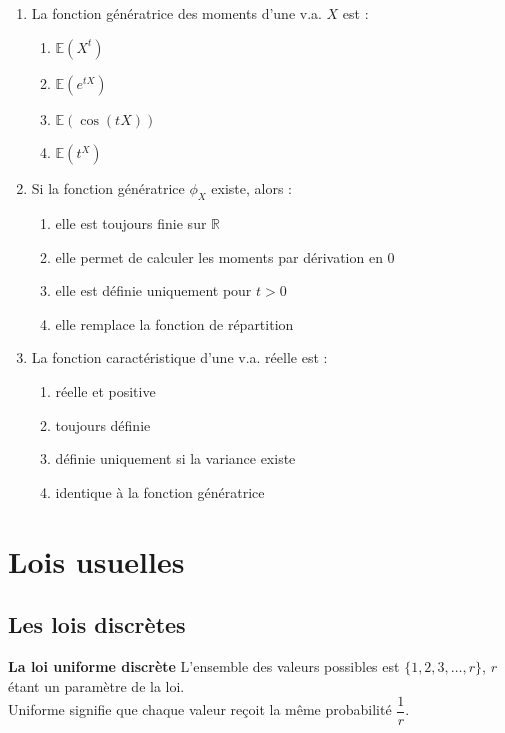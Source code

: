 \documentclass[../PolyS4.tex]{subfiles}
\begin{document}
\begin{enumerate}
\item La fonction génératrice des moments d'une v.a. $X$ est :
\begin{enumerate}
\item $\mathbb E(X^t)$
\item $\mathbb E(e^{tX})$
\item $\mathbb E(\cos(tX))$
\item $\mathbb E(t^X)$
\end{enumerate}

\item Si la fonction génératrice $\phi_X$ existe, alors :
\begin{enumerate}
\item elle est toujours finie sur $\mathbb R$
\item elle permet de calculer les moments par dérivation en $0$
\item elle est définie uniquement pour $t>0$
\item elle remplace la fonction de répartition
\end{enumerate}

\item La fonction caractéristique d'une v.a. réelle est :
\begin{enumerate}
\item réelle et positive
\item toujours définie
\item définie uniquement si la variance existe
\item identique à la fonction génératrice
\end{enumerate}
\end{enumerate}


\section{Lois usuelles}
\subsection{Les lois discrètes}
\textbf{ La loi uniforme discrète}
L'ensemble des valeurs possibles est $\{1, 2, 3, \dots , r\}$, $r$ étant un paramètre
de la loi.\\
 Uniforme signifie que chaque valeur reçoit la même probabilité $\dfrac{1}{r}$.\\
\end{document}
